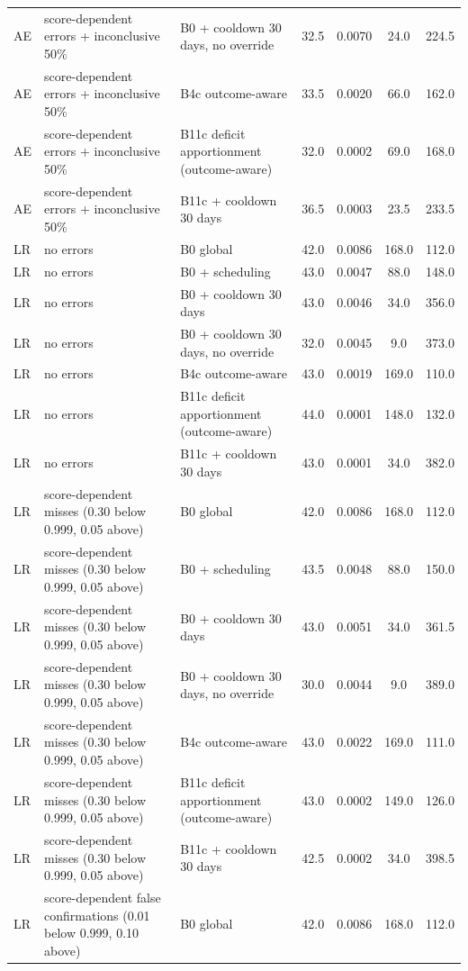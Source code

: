 \begin{longtable}{lp{5.2cm}p{4.4cm}cccc}
AE & score-dependent errors + inconclusive 50\% & B0 + cooldown 30 days, no override & 32.5 & 0.0070 & 24.0 & 224.5 \\
AE & score-dependent errors + inconclusive 50\% & B4c outcome-aware & 33.5 & 0.0020 & 66.0 & 162.0 \\
AE & score-dependent errors + inconclusive 50\% & B11c deficit apportionment (outcome-aware) & 32.0 & 0.0002 & 69.0 & 168.0 \\
AE & score-dependent errors + inconclusive 50\% & B11c + cooldown 30 days & 36.5 & 0.0003 & 23.5 & 233.5 \\
LR & no errors & B0 global & 42.0 & 0.0086 & 168.0 & 112.0 \\
LR & no errors & B0 + scheduling & 43.0 & 0.0047 & 88.0 & 148.0 \\
LR & no errors & B0 + cooldown 30 days & 43.0 & 0.0046 & 34.0 & 356.0 \\
LR & no errors & B0 + cooldown 30 days, no override & 32.0 & 0.0045 & 9.0 & 373.0 \\
LR & no errors & B4c outcome-aware & 43.0 & 0.0019 & 169.0 & 110.0 \\
LR & no errors & B11c deficit apportionment (outcome-aware) & 44.0 & 0.0001 & 148.0 & 132.0 \\
LR & no errors & B11c + cooldown 30 days & 43.0 & 0.0001 & 34.0 & 382.0 \\
LR & score-dependent misses (0.30 below 0.999, 0.05 above) & B0 global & 42.0 & 0.0086 & 168.0 & 112.0 \\
LR & score-dependent misses (0.30 below 0.999, 0.05 above) & B0 + scheduling & 43.5 & 0.0048 & 88.0 & 150.0 \\
LR & score-dependent misses (0.30 below 0.999, 0.05 above) & B0 + cooldown 30 days & 43.0 & 0.0051 & 34.0 & 361.5 \\
LR & score-dependent misses (0.30 below 0.999, 0.05 above) & B0 + cooldown 30 days, no override & 30.0 & 0.0044 & 9.0 & 389.0 \\
LR & score-dependent misses (0.30 below 0.999, 0.05 above) & B4c outcome-aware & 43.0 & 0.0022 & 169.0 & 111.0 \\
LR & score-dependent misses (0.30 below 0.999, 0.05 above) & B11c deficit apportionment (outcome-aware) & 43.0 & 0.0002 & 149.0 & 126.0 \\
LR & score-dependent misses (0.30 below 0.999, 0.05 above) & B11c + cooldown 30 days & 42.5 & 0.0002 & 34.0 & 398.5 \\
LR & score-dependent false confirmations (0.01 below 0.999, 0.10 above) & B0 global & 42.0 & 0.0086 & 168.0 & 112.0 \\

\end{longtable}
